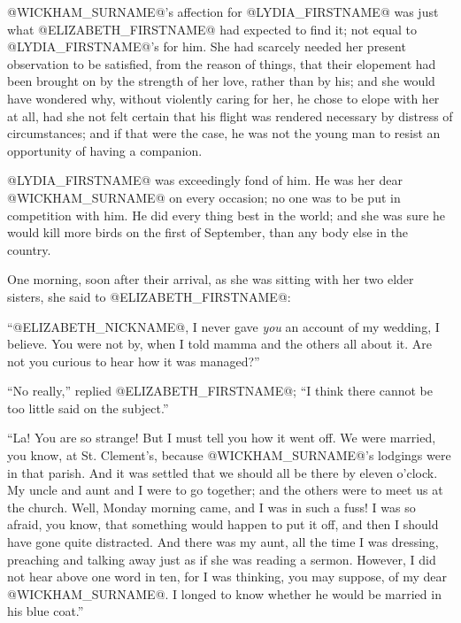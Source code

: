 @WICKHAM_SURNAME@'s affection for @LYDIA_FIRSTNAME@ was just what @ELIZABETH_FIRSTNAME@ had expected
to find it; not equal to @LYDIA_FIRSTNAME@'s for him. She had scarcely needed her
present observation to be satisfied, from the reason of things, that
their elopement had been brought on by the strength of her love, rather
than by his; and she would have wondered why, without violently caring
for her, he chose to elope with her at all, had she not felt certain
that his flight was rendered necessary by distress of circumstances; and
if that were the case, he was not the young man to resist an opportunity
of having a companion.

@LYDIA_FIRSTNAME@ was exceedingly fond of him. He was her dear @WICKHAM_SURNAME@ on every
occasion; no one was to be put in competition with him. He did every
thing best in the world; and she was sure he would kill more birds on
the first of September, than any body else in the country.

One morning, soon after their arrival, as she was sitting with her two
elder sisters, she said to @ELIZABETH_FIRSTNAME@:

``@ELIZABETH_NICKNAME@, I never gave \textit{you} an account of my wedding, I believe. You
were not by, when I told mamma and the others all about it. Are not you
curious to hear how it was managed?''

``No really,'' replied @ELIZABETH_FIRSTNAME@; ``I think there cannot be too little said
on the subject.''

``La! You are so strange! But I must tell you how it went off. We were
married, you know, at St. Clement's, because @WICKHAM_SURNAME@'s lodgings were in
that parish. And it was settled that we should all be there by eleven
o'clock. My uncle and aunt and I were to go together; and the others
were to meet us at the church. Well, Monday morning came, and I was in
such a fuss! I was so afraid, you know, that something would happen to
put it off, and then I should have gone quite distracted. And there was
my aunt, all the time I was dressing, preaching and talking away just as
if she was reading a sermon. However, I did not hear above one word in
ten, for I was thinking, you may suppose, of my dear @WICKHAM_SURNAME@. I longed
to know whether he would be married in his blue coat.''

